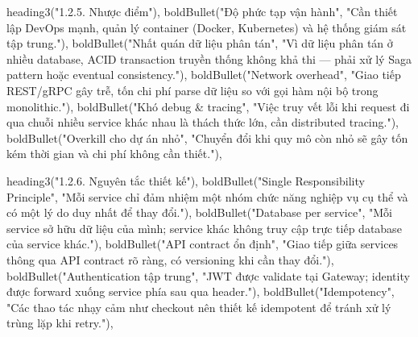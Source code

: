   heading3("1.2.5. Nhược điểm"),
  boldBullet("Độ phức tạp vận hành", "Cần thiết lập DevOps mạnh, quản lý container (Docker, Kubernetes) và hệ thống giám sát tập trung."),
  boldBullet("Nhất quán dữ liệu phân tán", "Vì dữ liệu phân tán ở nhiều database, ACID transaction truyền thống không khả thi — phải xử lý Saga pattern hoặc eventual consistency."),
  boldBullet("Network overhead", "Giao tiếp REST/gRPC gây trễ, tốn chi phí parse dữ liệu so với gọi hàm nội bộ trong monolithic."),
  boldBullet("Khó debug & tracing", "Việc truy vết lỗi khi request đi qua chuỗi nhiều service khác nhau là thách thức lớn, cần distributed tracing."),
  boldBullet("Overkill cho dự án nhỏ", "Chuyển đổi khi quy mô còn nhỏ sẽ gây tốn kém thời gian và chi phí không cần thiết."),

  heading3("1.2.6. Nguyên tắc thiết kế"),
  boldBullet("Single Responsibility Principle", "Mỗi service chỉ đảm nhiệm một nhóm chức năng nghiệp vụ cụ thể và có một lý do duy nhất để thay đổi."),
  boldBullet("Database per service", "Mỗi service sở hữu dữ liệu của mình; service khác không truy cập trực tiếp database của service khác."),
  boldBullet("API contract ổn định", "Giao tiếp giữa services thông qua API contract rõ ràng, có versioning khi cần thay đổi."),
  boldBullet("Authentication tập trung", "JWT được validate tại Gateway; identity được forward xuống service phía sau qua header."),
  boldBullet("Idempotency", "Các thao tác nhạy cảm như checkout nên thiết kế idempotent để tránh xử lý trùng lặp khi retry."),

